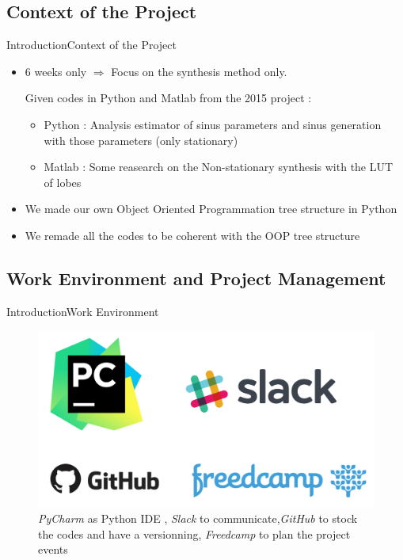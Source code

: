 \documentclass{bredelebeamer}
\begin{document}
\subsection{Context of the Project}
\begin{frame}{Introduction}{Context of the Project}

  \begin{itemize}
    \item<1-> 6 weeks only $\Rightarrow$ Focus on the synthesis method only.
   \begin{block}{}
	 Given codes in Python and Matlab from the 2015 project :
   \begin{itemize}
 	\item<1-> Python : Analysis estimator of sinus parameters and sinus generation with those parameters (only stationary)
 	\item<1-> Matlab : Some reasearch on the Non-stationary synthesis with the LUT of lobes
   \end{itemize}
   \end{block}   
	\item<1-> We made our own Object Oriented Programmation tree structure in Python
	\item<1-> We remade all the codes to be coherent with the OOP tree structure
  \end{itemize}
\end{frame}

\subsection{Work Environment and Project Management}
\begin{frame}{Introduction}{Work Environment}

\begin{figure}
	\centering
	\includegraphics[scale=0.4]{all_softwares.png}
	\caption{ {\it PyCharm} as Python IDE , {\it Slack} to communicate,{\it GitHub} to stock the codes and have a versionning, {\it Freedcamp} to plan the project events }
\end{figure}
\end{frame}
\end{document}
